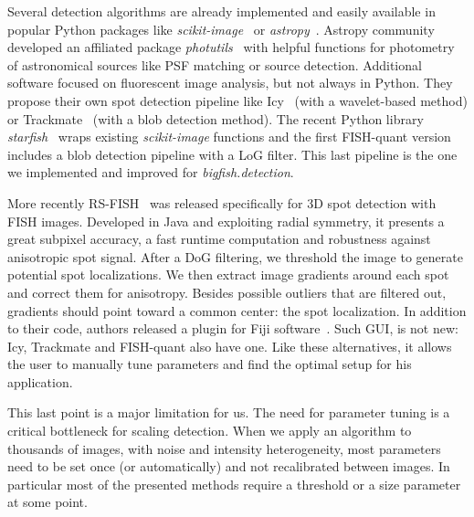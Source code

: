 Several detection algorithms are already implemented and easily available in popular Python packages like \emph{scikit-image}~\cite{walt_scikit-image_2014} or \emph{astropy}~\cite{astropy_2018}.
Astropy community developed an affiliated package \emph{photutils}~\cite{larry_bradley_2020_4044744} with helpful functions for photometry of astronomical sources like \ac{PSF} matching or source detection.
Additional software focused on fluorescent image analysis, but not always in Python.
They propose their own spot detection pipeline like Icy~\cite{de_chaumont_icy_2012} (with a wavelet-based method) or Trackmate~\cite{ershov_trackmate_2022} (with a blob detection method).
The recent Python library \emph{starfish}~\cite{perkel_starfish_2019} wraps existing \emph{scikit-image} functions and the first FISH-quant version~\cite{mueller_fish-quant_2013} includes a blob detection pipeline with a \ac{LoG} filter.
This last pipeline is the one we implemented and improved for \emph{bigfish.detection}.

More recently RS-FISH~\cite{bahry_rs-fish_2021} was released specifically for 3D spot detection with \ac{FISH} images.
Developed in Java and exploiting radial symmetry, it presents a great subpixel accuracy, a fast runtime computation and robustness against anisotropic spot signal.
After a \ac{DoG} filtering, we threshold the image to generate potential spot localizations.
We then extract image gradients around each spot and correct them for anisotropy.
Besides possible outliers that are filtered out, gradients should point toward a common center: the spot localization.
In addition to their code, authors released a plugin for Fiji software~\cite{schindelin_fiji_2012}.
Such \ac{GUI}, is not new: Icy, Trackmate and FISH-quant also have one.
Like these alternatives, it allows the user to manually tune parameters and find the optimal setup for his application.

This last point is a major limitation for us.
The need for parameter tuning is a critical bottleneck for scaling detection.
When we apply an algorithm to thousands of images, with noise and intensity heterogeneity, most parameters need to be set once (or automatically) and not recalibrated between images.
In particular most of the presented methods require a threshold or a size parameter at some point.



